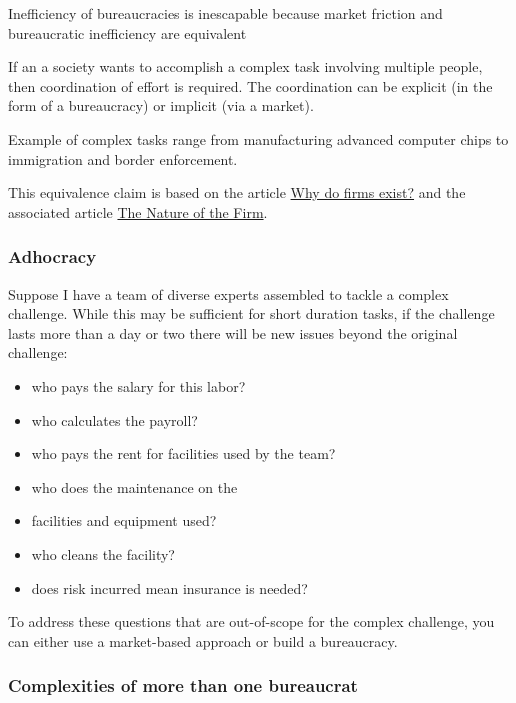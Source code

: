 Inefficiency of bureaucracies is inescapable because market friction and bureaucratic inefficiency are equivalent

If an a society wants to accomplish a complex task involving multiple people, then coordination of effort is required. The coordination can be explicit (in the form of a bureaucracy) or implicit (via a market). 

Example of complex tasks range from manufacturing advanced computer chips to immigration and border enforcement. 

This equivalence claim is based on the article \href{http://www.economist.com/node/17730360}{Why do firms exist?} and the associated article \href{https://en.wikipedia.org/wiki/The_Nature_of_the_Firm}{The Nature of the Firm}.

\cite{2012_Wilson}

\subsubsection{Adhocracy}

Suppose I have a team of diverse experts assembled to tackle a complex challenge.
While this may be sufficient for short duration tasks, if the challenge lasts more than a day or two there will be new issues beyond the original challenge:

\begin{itemize}
    \item who pays the salary for this labor?
    \item who calculates the payroll?
    \item who pays the rent for facilities used by the team?
    \item who does the maintenance on the     \item facilities and equipment used?
    \item who cleans the facility?
    \item does risk incurred mean insurance is needed?
\end{itemize}
To address these questions that are out-of-scope for the complex challenge, you can either use a market-based approach or build a bureaucracy. 

\subsubsection{Complexities of more than one bureaucrat}

